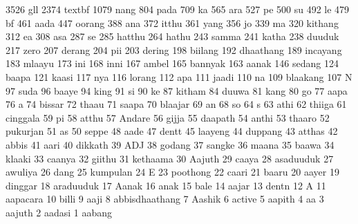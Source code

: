    3526 gll
   2374 textbf
   1079 nang
    804 pada
    709 ka
    565 ara
    527 pe
    500 su
    492 le
    479 bf
    461 aada
    447 oorang
    388 ana
    372 itthu
    361 yang
    356 jo
    339 ma
    320 kithang
    312 ea
    308 asa
    287 se
    285 hatthu
    264 hathu
    243 samma
    241 katha
    238 duuduk
    217 zero
    207 derang
    204 pii
    203 dering
    198 biilang
    192 dhaathang
    189 incayang
    183 mlaayu
    173 ini
    168 inni
    167 ambel
    165 bannyak
    163 aanak
    146 sedang
    124 baapa
    121 kaasi
    117 nya
    116 lorang
    112 apa
    111 jaadi
    110 na
    109 blaakang
    107 N
     97 suda
     96 baaye
     94 king
     91 si
     90 ke
     87 kitham
     84 duuwa
     81 kang
     80 go
     77 aapa
     76 a
     74 bissar
     72 thaau
     71 saapa
     70 blaajar
     69 an
     68 so
     64 s
     63 athi
     62 thiiga
     61 cinggala
     59 pi
     58 atthu
     57 Andare
     56 gijja
     55 daapath
     54 anthi
     53 thaaro
     52 pukurjan
     51 as
     50 seppe
     48 aade
     47 dentt
     45 laayeng
     44 duppang
     43 atthas
     42 abbis
     41 aari
     40 dikkath
     39 ADJ
     38 godang
     37 sangke
     36 maana
     35 baawa
     34 klaaki
     33 caanya
     32 giithu
     31 kethaama
     30 Aajuth
     29 caaya
     28 asaduuduk
     27 awuliya
     26 dang
     25 kumpulan
     24 E
     23 poothong
     22 caari
     21 baaru
     20 aayer
     19 dinggar
     18 araduuduk
     17 Aanak
     16 anak
     15 bale
     14 aajar
     13 dentn
     12 A
     11 aapacara
     10 billi
      9 aaji
      8 abbisdhaathang
      7 Aashik
      6 active
      5 aapith
      4 aa
      3 aajuth
      2 aadasi
      1 aabang
